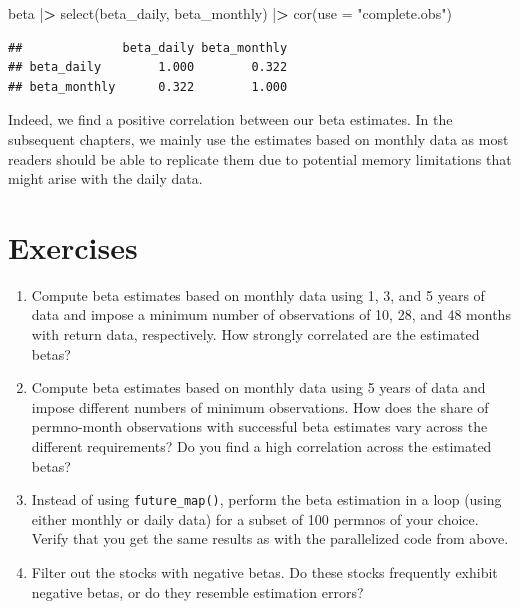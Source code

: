\documentclass[
]{book}
\newenvironment{Shaded}{\begin{snugshade}}{\end{snugshade}}
\newcommand{\AttributeTok}[1]{\textcolor[rgb]{0.61,0.61,0.61}{#1}}
\newcommand{\ErrorTok}[1]{\textcolor[rgb]{0.14,0.14,0.14}{\textbf{#1}}}
\newcommand{\FunctionTok}[1]{\textcolor[rgb]{0,0,0}{#1}}
\newcommand{\NormalTok}[1]{#1}
\newcommand{\SpecialCharTok}[1]{\textcolor[rgb]{0,0,0}{#1}}
\newcommand{\StringTok}[1]{\textcolor[rgb]{0.5,0.5,0.5}{#1}}
\providecommand{\tightlist}{%
  \setlength{\itemsep}{0pt}\setlength{\parskip}{0pt}}
\begin{document}
\begin{Shaded}
\begin{Highlighting}[]
\NormalTok{beta }\SpecialCharTok{|}\ErrorTok{\textgreater{}}
  \FunctionTok{select}\NormalTok{(beta\_daily, beta\_monthly) }\SpecialCharTok{|}\ErrorTok{\textgreater{}}
  \FunctionTok{cor}\NormalTok{(}\AttributeTok{use =} \StringTok{"complete.obs"}\NormalTok{)}
\end{Highlighting}
\end{Shaded}

\begin{verbatim}
##              beta_daily beta_monthly
## beta_daily        1.000        0.322
## beta_monthly      0.322        1.000
\end{verbatim}

Indeed, we find a positive correlation between our beta estimates. In the subsequent chapters, we mainly use the estimates based on monthly data as most readers should be able to replicate them due to potential memory limitations that might arise with the daily data.

\hypertarget{exercises-3}{%
\section{Exercises}\label{exercises-3}}

\begin{enumerate}
\def\labelenumi{\arabic{enumi}.}
\tightlist
\item
  Compute beta estimates based on monthly data using 1, 3, and 5 years of data and impose a minimum number of observations of 10, 28, and 48 months with return data, respectively. How strongly correlated are the estimated betas?
\item
  Compute beta estimates based on monthly data using 5 years of data and impose different numbers of minimum observations. How does the share of permno-month observations with successful beta estimates vary across the different requirements? Do you find a high correlation across the estimated betas?
\item
  Instead of using \texttt{future\_map()}, perform the beta estimation in a loop (using either monthly or daily data) for a subset of 100 permnos of your choice. Verify that you get the same results as with the parallelized code from above.
\item
  Filter out the stocks with negative betas. Do these stocks frequently exhibit negative betas, or do they resemble estimation errors?
\end{enumerate}
\end{document}
